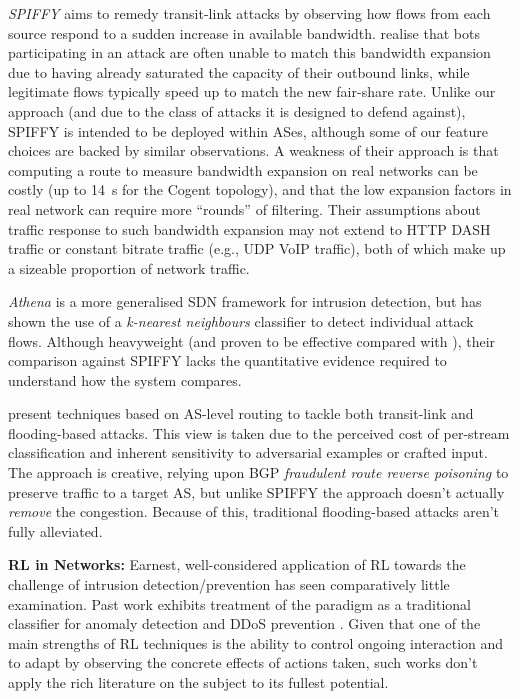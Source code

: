 \documentclass[10pt, times, conference, letterpaper]{IEEEtran}
\newcommand{\fakepara}[1]{\noindent\textbf{#1:}}
\begin{document}
\emph{SPIFFY} \cite{DBLP:conf/ndss/KangGS16} aims to remedy transit-link attacks by observing how flows from each source respond to a sudden increase in available bandwidth.
 realise that bots participating in an attack are often unable to match this bandwidth expansion due to having already saturated the capacity of their outbound links, while legitimate flows typically speed up to match the new fair-share rate.
Unlike our approach (and due to the class of attacks it is designed to defend against), SPIFFY is intended to be deployed within ASes, although some of our feature choices are backed by similar observations.
A weakness of their approach is that computing a route to measure bandwidth expansion on real networks can be costly (up to \SI{14}{\second} for the Cogent topology), and that the low expansion factors in real network can require more ``rounds'' of filtering. 
Their assumptions about traffic response to such bandwidth expansion may not extend to HTTP DASH traffic or constant bitrate traffic (e.g., UDP VoIP traffic), both of which make up a sizeable proportion of network traffic.

\emph{Athena} \cite{DBLP:conf/dsn/LeeKSPY17} is a more generalised SDN framework for intrusion detection, but has shown the use of a \emph{k-nearest neighbours} classifier to detect individual attack flows.
Although heavyweight (and proven to be effective compared with \textcite{DBLP:conf/lcn/BragaMP10}), their comparison against SPIFFY lacks the quantitative evidence required to understand how the system compares.

\Textcite{DBLP:conf/sp/SmithS18} present techniques based on AS-level routing to tackle both transit-link and flooding-based attacks.
This view is taken due to the perceived cost of per-stream classification and inherent sensitivity to adversarial examples or crafted input.
The approach is creative, relying upon BGP \emph{fraudulent route reverse poisoning} to preserve traffic to a target AS, but unlike SPIFFY the approach doesn't actually \emph{remove} the congestion.
Because of this, traditional flooding-based attacks aren't fully alleviated.

\fakepara{RL in Networks}
Earnest, well-considered application of RL towards the challenge of intrusion detection/prevention has seen comparatively little examination.
Past work exhibits treatment of the paradigm as a traditional classifier for anomaly detection \cite{shamshirband2014anomaly} and DDoS prevention \cite{DBLP:conf/mates/ServinK08}.
Given that one of the main strengths of RL techniques is the ability to control ongoing interaction and to adapt by observing the concrete effects of actions taken, such works don't apply the rich literature on the subject to its fullest potential.
\end{document}
